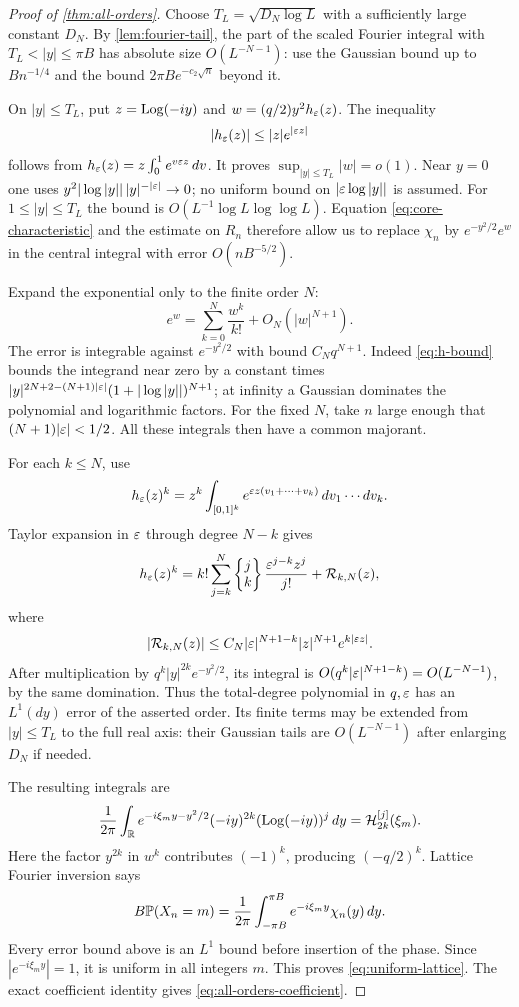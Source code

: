 \begin{proof}[Proof of \cref{thm:all-orders}]
Choose
$T_L=\sqrt{D_N\log L}$ with a sufficiently large constant $D_N$.
By \cref{lem:fourier-tail}, the part of the scaled Fourier integral
with $T_L<|y|\le\pi B$ has absolute size
$O(L^{-N-1})$: use the Gaussian bound up to $Bn^{-1/4}$ and
the bound $2\pi B e^{-c_2\sqrt n}$ beyond it.

On $|y|\le T_L$, put $z=\operatorname{Log}(-iy)$ and
$w=(q/2)y^2h_\varepsilon(z)$. The inequality
\begin{equation}\label{eq:h-bound}
 |h_\varepsilon(z)|\le |z|e^{|\varepsilon z|}
\end{equation}
follows from $h_\varepsilon(z)=z\int_0^1e^{v\varepsilon z}\,dv$.
It proves $\sup_{|y|\le T_L}|w|=o(1)$. Near $y=0$ one uses
$y^2|\log|y||\,|y|^{-|\varepsilon|}\to0$; no uniform bound on
$|\varepsilon\log|y||$ is assumed. For $1\le|y|\le T_L$ the bound is
$O(L^{-1}\log L\log\log L)$.
Equation \eqref{eq:core-characteristic} and the estimate on $R_n$
therefore allow us to replace $\chi_n$ by
$e^{-y^2/2}e^w$ in the central integral with error
$O(nB^{-5/2})$.

Expand the exponential only to the finite order $N$:
\[
 e^w=\sum_{k=0}^N\frac{w^k}{k!}+O_N(|w|^{N+1}).
\]
The error is integrable against $e^{-y^2/2}$ with bound
$C_N q^{N+1}$. Indeed \eqref{eq:h-bound} bounds the integrand near
zero by a constant times
$|y|^{2N+2-(N+1)|\varepsilon|}(1+|\log|y||)^{N+1}$;
at infinity a Gaussian dominates the polynomial and logarithmic
factors. For the fixed $N$, take $n$ large enough that
$(N+1)|\varepsilon|<1/2$. All these integrals then have a common majorant.

For each $k\le N$, use
\begin{equation}\label{eq:cube-integral}
 h_\varepsilon(z)^k=z^k\int_{[0,1]^k}
      e^{\varepsilon z(v_1+\cdots+v_k)}\,dv_1\cdots dv_k.
\end{equation}
Taylor expansion in $\varepsilon$ through degree $N-k$ gives
\[
 h_\varepsilon(z)^k
 =k!\sum_{j=k}^N\left\{\begin{matrix}j\\k\end{matrix}\right\}\frac{\varepsilon^{j-k}z^j}{j!}
    +\mathcal R_{k,N}(z),
\]
where
\[
 |\mathcal R_{k,N}(z)|\le
 C_N|\varepsilon|^{N+1-k}|z|^{N+1}e^{k|\varepsilon z|}.
\]
After multiplication by $q^k|y|^{2k}e^{-y^2/2}$, its integral is
$O(q^k|\varepsilon|^{N+1-k})=O(L^{-N-1})$, by the same domination.
Thus the total-degree polynomial in $q,\varepsilon$ has an $L^1(dy)$
error of the asserted order. Its finite terms may be extended from
$|y|\le T_L$ to the full real axis: their Gaussian tails are
$O(L^{-N-1})$ after enlarging $D_N$ if needed.

The resulting integrals are
\[
 \frac1{2\pi}\int_\mathbb R e^{-i\xi_m y-y^2/2}
       (-iy)^{2k}(\operatorname{Log}(-iy))^j\,dy
       =\mathcal H_{2k}^{[j]}(\xi_m).
\]
Here the factor $y^{2k}$ in $w^k$ contributes $(-1)^k$, producing
$(-q/2)^k$. Lattice Fourier inversion says
\[
 B\mathbb P(X_n=m)
 =\frac1{2\pi}\int_{-\pi B}^{\pi B}
                 e^{-i\xi_m y}\chi_n(y)\,dy.
\]
Every error bound above is an $L^1$ bound before insertion of the
phase. Since $|e^{-i\xi_m y}|=1$, it is uniform in all integers $m$.
This proves \eqref{eq:uniform-lattice}. The exact coefficient identity
gives \eqref{eq:all-orders-coefficient}.


\end{proof}
